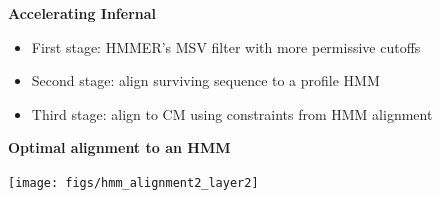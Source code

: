 \documentclass[landscape]{slides}
\begin{document}
\begin{slide}
\begin{center}
\textbf{Accelerating Infernal}
\end{center}

\medskip

\begin{itemize}
\item First stage: HMMER's MSV filter with more permissive cutoffs

\item Second stage: align surviving sequence to a profile HMM

\item Third stage: align to CM using constraints from HMM alignment
\end{itemize}

\vfill 
\end{slide}
\begin{slide}
\begin{center}

\textbf{Optimal alignment to an HMM}

\texttt{[image: figs/hmm\_alignment2\_layer2]}
\end{center}

\vfill
\end{slide}
\end{document}
